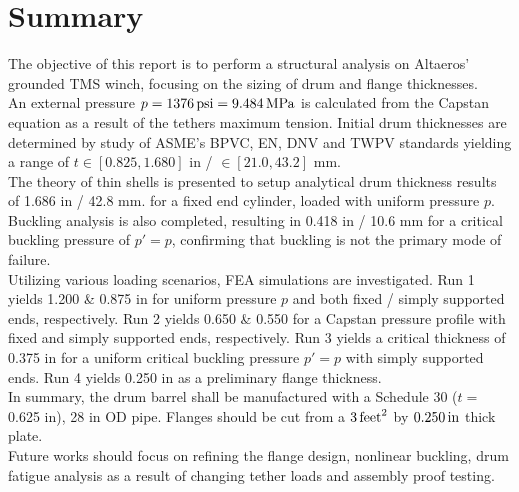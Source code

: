 \chapter{Summary}

The objective of this report is to perform a structural analysis on Altaeros' grounded TMS winch, focusing on the sizing of drum and flange thicknesses.\\

An external pressure $p=1376\,\mathrm{psi}= 9.484\,\mathrm{MPa}$ is calculated from the Capstan equation as a result of the tethers maximum tension. Initial drum thicknesses are determined by study of ASME's BPVC, EN, DNV and TWPV standards yielding a range of $t\in [0.825, 1.680]$ in / $\in [21.0, 43.2]$ mm.\\

The theory of thin shells is presented to setup analytical drum thickness results of 1.686 in / 42.8 mm. for a fixed end cylinder, loaded with uniform pressure $p$. Buckling analysis is also completed, resulting in 0.418 in / 10.6 mm for a critical buckling pressure of $p'=p$, confirming that buckling is not the primary mode of failure.\\

Utilizing various loading scenarios, FEA simulations are investigated. Run 1 yields 1.200 \& 0.875 in for uniform pressure $p$ and both fixed / simply supported ends, respectively. Run 2 yields 0.650 \& 0.550 for a Capstan pressure profile with fixed and simply supported ends, respectively. Run 3 yields a critical thickness of 0.375 in for a uniform critical buckling pressure $p'=p$ with simply supported ends. Run 4 yields 0.250 in as a preliminary flange thickness.\\

In summary, the drum barrel shall be manufactured with a Schedule 30 ($t=$ 0.625 in), 28 in OD pipe. Flanges should be cut from a $3\,\mathrm{feet}^2$ by $0.250\,\mathrm{in}$ thick plate.\\

Future works should focus on refining the flange design, nonlinear buckling, drum fatigue analysis as a result of changing tether loads and assembly proof testing.